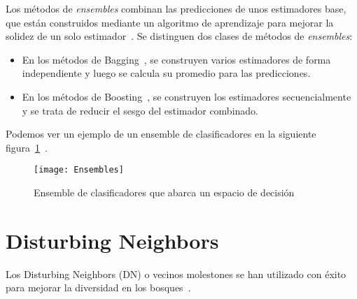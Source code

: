 Los métodos de \textit{ensembles} combinan las predicciones de unos estimadores base, que están construidos mediante un algoritmo de aprendizaje para mejorar la solidez de un solo estimador~\cite{ensemble}.
Se distinguen dos clases de métodos de \textit{ensembles}:
	\begin{itemize}
		\item En los métodos de Bagging~\cite{bagging}, se construyen varios estimadores de forma independiente y luego se calcula su promedio para las predicciones.
		\item En los métodos de Boosting~\cite{boosting}, se construyen los estimadores secuencialmente y se trata de reducir el sesgo del estimador combinado. 
	\end{itemize}
	
Podemos ver un ejemplo de un ensemble de clasificadores en la siguiente figura~\ref{fig:Ensembles}~\cite{figensemble}.

\begin{figure}
\centering
\texttt{[image: Ensembles]}
\caption{Ensemble de clasificadores que abarca un espacio de decisión}
\label{fig:Ensembles}
\end{figure}

\section{Disturbing Neighbors}

Los Disturbing Neighbors (DN) o vecinos molestones se han utilizado con éxito para mejorar la diversidad en los bosques~\cite{disturbingneighbors}.

